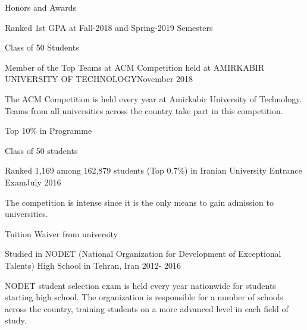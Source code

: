 \documentclass{resume} %
\begin{document}
	\begin{rSection}{Honors and Awards}
		
		\begin{rSubsection}{Ranked 1st GPA at Fall-2018 and Spring-2019 Semesters }{ }{ }{ }
			\item Class of 50 Students
		\end{rSubsection}	
		
		\begin{rSubsection}{Member of the Top Teams at ACM Competition held at AMIRKABIR UNIVERSITY OF TECHNOLOGY}{November 2018}{ }{ }
			\item The ACM Competition is held every year at Amirkabir University of Technology. Teams from all universities across the country take part in this competition.
		\end{rSubsection}
		
		\begin{rSubsection}{Top 10\% in Programme}{ }{ }{ }
			\item Class of 50 students
		\end{rSubsection}
		
		\begin{rSubsection}{Ranked 1,169 among 162,879 students (Top 0.7\%) in Iranian University Entrance Exam}{July 2016}{ }{ }
			\item The competition is intense since it is the only means to gain admission to universities.
			\item Tuition Waiver from university
		\end{rSubsection} 
		
		\begin{rSubsection}{Studied in NODET (National Organization for Development of Exceptional Talents) High School in Tehran, Iran }{2012- 2016}{ }{ }
			\item NODET student selection exam is held every year nationwide for students starting high school. The organization is responsible for a number of schools across the country, training students on a more advanced level in each field of study.
		\end{rSubsection}
		
	\end{rSection}
\end{document}
